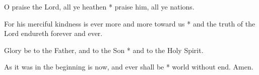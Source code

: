 O praise the Lord, all ye heathen * praise him, all ye nations.
	
For his merciful kindness is ever more and more toward us * and the truth of the Lord endureth forever and ever.
	
Glory be to the Father, and to the Son * and to the Holy Spirit.
	
As it was in the beginning is now, and ever shall be * world without end. Amen.